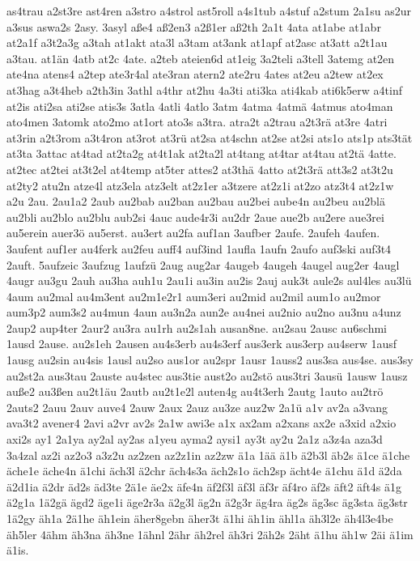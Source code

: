 {as4trau
a2st3re
ast4ren
a3stro
a4strol
ast5roll
a4s1tub
a4stuf
a2stum
2a1su
as2ur
a3sus
aswa2s
2asy.
3asyl
aße4
aß2en3
a2ß1er
aß2th
2a1t
4ata
at1abe
at1abr
at2a1f
a3t2a3g
a3tah
at1akt
ata3l
a3tam
at3ank
at1apf
at2asc
at3att
a2t1au
a3tau.
at1än
4atb
at2c
4ate.
a2teb
ateien6d
at1eig
3a2teli
a3tell
3atemg
at2en
ate4na
atens4
a2tep
ate3r4al
ate3ran
atern2
ate2ru
4ates
at2eu
a2tew
at2ex
at3hag
a3t4heb
a2th3in
3athl
a4thr
at2hu
4a3ti
ati3ka
ati4kab
ati6k5erw
a4tinf
at2is
ati2sa
ati2se
atis3s
3atla
4atli
4atlo
3atm
4atma
4atmä
4atmus
ato4man
ato4men
3atomk
ato2mo
at1ort
ato3s
a3tra.
atra2t
a2trau
a2t3rä
at3re
4atri
at3rin
a2t3rom
a3t4ron
at3rot
at3rü
at2sa
at4schn
at2se
at2si
ats1o
ats1p
ats3tät
at3ta
3attac
at4tad
at2ta2g
at4t1ak
at2ta2l
at4tang
at4tar
at4tau
at2tä
4atte.
at2tec
at2tei
at3t2el
at4temp
at5ter
attes2
at3thä
4atto
at2t3rä
att3s2
at3t2u
at2ty2
atu2n
atze4l
atz3ela
atz3elt
at2z1er
a3tzere
at2z1i
at2zo
atz3t4
at2z1w
a2u
2au.
2au1a2
2aub
au2bab
au2ban
au2bau
au2bei
aube4n
au2beu
au2blä
au2bli
au2blo
au2blu
aub2si
4auc
aude4r3i
au2dr
2aue
aue2b
au2ere
aue3rei
au5erein
auer3ö
au5erst.
au3ert
au2fa
auf1an
3aufber
2aufe.
2aufeh
4aufen.
3aufent
auf1er
au4ferk
au2feu
auff4
auf3ind
1aufla
1aufn
2aufo
auf3ski
auf3t4
2auft.
5aufzeic
3aufzug
1aufzü
2aug
aug2ar
4augeb
4augeh
4augel
aug2er
4augl
4augr
au3gu
2auh
au3ha
auh1u
2au1i
au3in
au2is
2auj
auk3t
aule2s
aul4les
au3lü
4aum
au2mal
au4m3ent
au2m1e2r1
aum3eri
au2mid
au2mil
aum1o
au2mor
aum3p2
aum3s2
au4mun
4aun
au3n2a
aun2e
au4nei
au2nio
au2no
au3nu
a4unz
2aup2
aup4ter
2aur2
au3ra
au1rh
au2s1ah
ausan8ne.
au2sau
2ausc
au6schmi
1ausd
2ause.
au2s1eh
2ausen
au4s3erb
au4s3erf
aus3erk
aus3erp
au4serw
1ausf
1ausg
au2sin
au4sis
1ausl
au2so
aus1or
au2spr
1ausr
1auss2
aus3sa
aus4se.
aus3sy
au2st2a
aus3tau
2auste
au4stec
aus3tie
aust2o
au2stö
aus3tri
3ausü
1ausw
1ausz
auße2
au3ßen
au2t1äu
2autb
au2t1e2l
auten4g
au4t3erh
2autg
1auto
au2trö
2auts2
2auu
2auv
auve4
2auw
2aux
2auz
au3ze
auz2w
2a1ü
a1v
av2a
a3vang
ava3t2
avener4
2avi
a2vr
av2s
2a1w
awi3e
a1x
ax2am
a2xans
ax2e
a3xid
a2xio
axi2s
ay1
2a1ya
ay2al
ay2as
a1yeu
ayma2
aysi1
ay3t
ay2u
2a1z
a3z4a
aza3d
3a4zal
az2i
az2o3
a3z2u
az2zen
az2z1in
az2zw
ä1a
1ää
ä1b
ä2b3l
äb2s
ä1ce
ä1che
äche1e
äche4n
ä1chi
äch3l
ä2chr
äch4s3a
äch2s1o
äch2sp
ächt4e
ä1chu
ä1d
ä2da
ä2d1ia
ä2dr
äd2s
äd3te
2ä1e
äe2x
äfe4n
äf2f3l
äf3l
äf3r
äf4ro
äf2s
äft2
äft4s
ä1g
ä2g1a
1ä2gä
ägd2
äge1i
äge2r3a
ä2g3l
äg2n
ä2g3r
äg4ra
äg2s
äg3sc
äg3sta
äg3str
1ä2gy
äh1a
2ä1he
äh1ein
äher8gebn
äher3t
ä1hi
äh1in
ähl1a
äh3l2e
äh4l3e4be
äh5ler
4ähm
äh3na
äh3ne
1ähnl
2ähr
äh2rel
äh3ri
2äh2s
2äht
ä1hu
äh1w
2äi
ä1im
ä1is.
}
